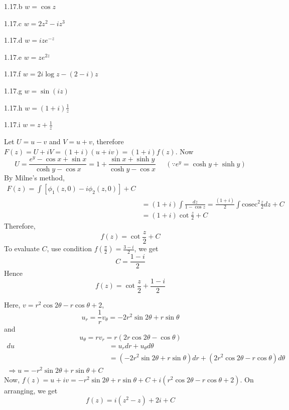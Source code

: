 \begin{Solution}{1.17.b}
		$w=\cos z$
	
\end{Solution}
\begin{Solution}{1.17.c}
	$w=2z^{2}-iz^{3}$
	
\end{Solution}
\begin{Solution}{1.17.d}
	$w=ize^{-z}$
	
\end{Solution}
\begin{Solution}{1.17.e}
	$w=ze^{2z}$
	
\end{Solution}
\begin{Solution}{1.17.f}
	$w=2i\log z-(2-i)z$
	
\end{Solution}
\begin{Solution}{1.17.g}
	$w=\sin(iz)$
	
\end{Solution}
\begin{Solution}{1.17.h}
	$w=(1+i)\frac{1}{z}$
	
\end{Solution}
\begin{Solution}{1.17.i}
	$w=z+\frac{1}{z}$
	
\end{Solution}
\begin{Solution}{1.18}
Let $U=u-v$ and $V=u+v$, therefore $F(z)=U+iV =(1+i)(u+iv)=(1+i)f(z)$. Now
\[U= \frac{e^y-\cos x+ \sin x}{\cosh y- \cos x} = 1+\frac{\sin x+ \sinh y}{\cosh y- \cos x}\;\;\;\;\;(\because e^y=\cosh y + \sinh y)\]
By Milne's method,
\begin{align*}
	F(z) = \int [\phi_1(z,0)-i\phi_2(z,0)] +C\\
	&=(1+i) \int \frac{dz}{1-\cos z} = \frac{(1+i)}{2} \int \text{cosec}^2\frac{z}{2} dz +C\\
	&=(1+i) \cot \frac{z}{2}  + C
\end{align*}
Therefore,
\[f(z) = \cot  \frac{z}{2} + C \]
To evaluate $C$, use condition $f\left(\frac{\pi}{2}\right)=\frac{3-i}{2}$, we get
\[C=\frac{1-i}{2}\]
Hence
\[f(z) = \cot  \frac{z}{2} + \frac{1-i}{2} \]

\end{Solution}
\begin{Solution}{1.19}
Here, $v=r^2 \cos 2 \theta - r  \cos \theta + 2$,
\[u_r=\frac{1}{r}v_{\theta} = -2r^2\sin 2\theta + r\sin \theta\]
and
\[u_{\theta}=rv_{r} =r(2r\cos 2 \theta - \cos \theta)\]
\begin{align*}
	du &= u_rdr+u_{\theta}d\theta  \\
	&= (-2r^2\sin 2\theta + r\sin \theta)dr + (2r^2\cos 2 \theta - r\cos \theta)d\theta \\
	\Rightarrow u=-r^2\sin 2\theta +r \sin \theta +C
\end{align*}
Now, $f(z) = u+iv = -r^2\sin 2\theta +r \sin \theta +C + i(r^2 \cos 2 \theta - r  \cos \theta + 2)$. On arranging, we get
\[f(z) = i(z^2-z)+2i+C\]
\end{Solution}
